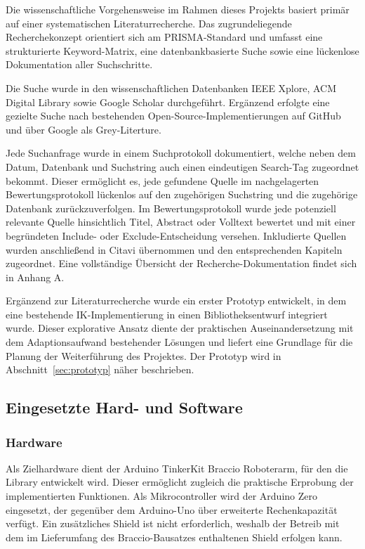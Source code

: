 \documentclass[12pt,a4paper]{article}
\begin{document}
Die wissenschaftliche Vorgehensweise im Rahmen dieses Projekts basiert primär auf einer systematischen Literaturrecherche. Das zugrundeliegende Recherchekonzept orientiert sich am PRISMA-Standard und umfasst eine strukturierte Keyword-Matrix, eine datenbankbasierte Suche sowie eine lückenlose Dokumentation aller Suchschritte. 

Die Suche wurde in den wissenschaftlichen Datenbanken IEEE Xplore, ACM Digital Library sowie Google Scholar durchgeführt. Ergänzend erfolgte eine gezielte Suche nach bestehenden Open-Source-Implementierungen auf GitHub und über Google als Grey-Literture. 

Jede Suchanfrage wurde in einem Suchprotokoll dokumentiert, welche neben dem Datum, Datenbank und Suchstring auch einen eindeutigen Search-Tag zugeordnet bekommt. Dieser ermöglicht es, jede gefundene Quelle im nachgelagerten Bewertungsprotokoll lückenlos auf den zugehörigen Suchstring und die zugehörige Datenbank zurückzuverfolgen. Im Bewertungsprotokoll wurde jede potenziell relevante Quelle hinsichtlich Titel, Abstract oder Volltext bewertet und mit einer begründeten Include- oder Exclude-Entscheidung versehen. Inkludierte Quellen wurden anschließend in Citavi übernommen und den entsprechenden Kapiteln zugeordnet. Eine vollständige Übersicht der Recherche-Dokumentation findet sich in Anhang A. 

Ergänzend zur Literaturrecherche wurde ein erster Prototyp entwickelt, in dem eine bestehende IK-Implementierung in einen Bibliotheksentwurf integriert wurde. Dieser explorative Ansatz diente der praktischen Auseinandersetzung mit dem Adaptionsaufwand bestehender Lösungen und liefert eine Grundlage für die Planung der Weiterführung des Projektes. Der Prototyp wird in Abschnitt~\ref{sec:prototyp} näher beschrieben.


\subsection{Eingesetzte Hard- und Software}
\subsubsection*{Hardware}
Als Zielhardware dient der Arduino TinkerKit Braccio Roboterarm, für den die Library entwickelt wird. Dieser ermöglicht zugleich die praktische Erprobung der implementierten Funktionen. Als Mikrocontroller wird der Arduino Zero eingesetzt, der gegenüber dem Arduino-Uno über erweiterte Rechenkapazität verfügt. Ein zusätzliches Shield ist nicht erforderlich, weshalb der Betreib mit dem im Lieferumfang des Braccio-Bausatzes enthaltenen Shield erfolgen kann.
\end{document}
